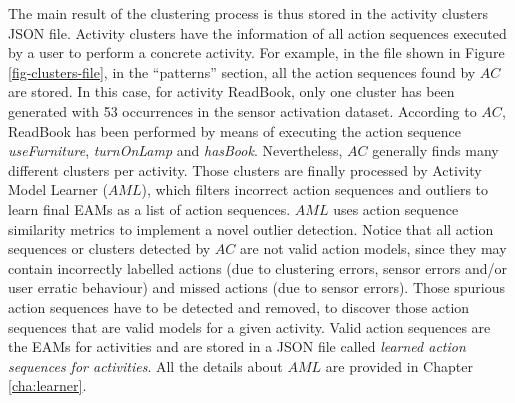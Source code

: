 The main result of the clustering process is thus stored in the activity clusters JSON file. Activity clusters have the information of all action sequences executed by a user to perform a concrete activity. For example, in the file shown in Figure \ref{fig-clusters-file}, in the ``patterns'' section, all the action sequences found by $AC$ are stored. In this case, for activity ReadBook, only one cluster has been generated with 53 occurrences in the sensor activation dataset. According to $AC$, ReadBook has been performed by means of executing the action sequence \textit{useFurniture}, \textit{turnOnLamp} and \textit{hasBook}. Nevertheless, $AC$ generally finds many different clusters per activity. Those clusters are finally processed by Activity Model Learner ($AML$), which filters incorrect action sequences and outliers to learn final EAMs as a list of action sequences. $AML$ uses action sequence similarity metrics to implement a novel outlier detection. Notice that all action sequences or clusters detected by $AC$ are not valid action models, since they may contain incorrectly labelled actions (due to clustering errors, sensor errors and/or user erratic behaviour) and missed actions (due to sensor errors). Those spurious action sequences have to be detected and removed, to discover those action sequences that are valid models for a given activity. Valid action sequences are the EAMs for activities and are stored in a JSON file called \textit{learned action sequences for activities}. All the details about $AML$ are provided in Chapter \ref{cha:learner}.